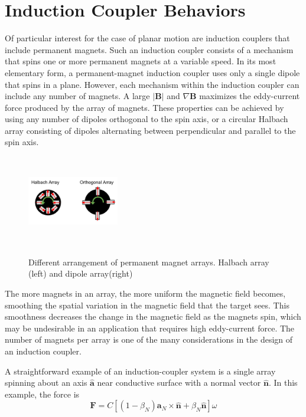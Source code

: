 \section{Induction Coupler Behaviors}

Of particular interest for the case of planar motion are induction couplers that include permanent magnets. Such an induction coupler consists of a mechanism that spins one or more permanent magnets at a variable speed. In its most elementary form, a permanent-magnet induction coupler uses only a single dipole that spins in a plane. However, each mechanism within the induction coupler can include any number of magnets. A large $\vert \textbf{B} \vert$ and $\nabla \textbf{B}$ maximizes the eddy-current force produced by the array of magnets. These properties can be achieved by using any number of dipoles orthogonal to the spin axis, or a circular Halbach array consisting of dipoles alternating between perpendicular and parallel to the spin axis.

\begin{figure}
\includegraphics[width = 4cm, height = 4cm ]{figures/Magnet_Arrays.png}
\label{fig:magnet_arrays}
\caption{Different arrangement of permanent magnet arrays. Halbach array (left) and dipole array(right)}
\end{figure}

The more magnets in an array, the more uniform the magnetic field becomes, smoothing the spatial variation in the magnetic field that the target sees. This smoothness decreases the change in the magnetic field as the magnets spin, which may be undesirable in an application that requires high eddy-current force. The number of magnets per array is one of the many considerations in the design of an induction coupler.

A straightforward example of an induction-coupler system is a single array spinning about an axis $\hat{\boldsymbol{a}}$ near conductive surface with a normal vector $\hat{\boldsymbol{n}}$. In this example, the force is 
\begin{equation}\label{singlemagforce}
\textbf{F} = C\left[  \left(1-\beta_N \right )\boldsymbol{a}_N{\times}\hat{\boldsymbol{n}} + \beta_N\hat{\boldsymbol{n}} \right ] \omega
\end{equation}

